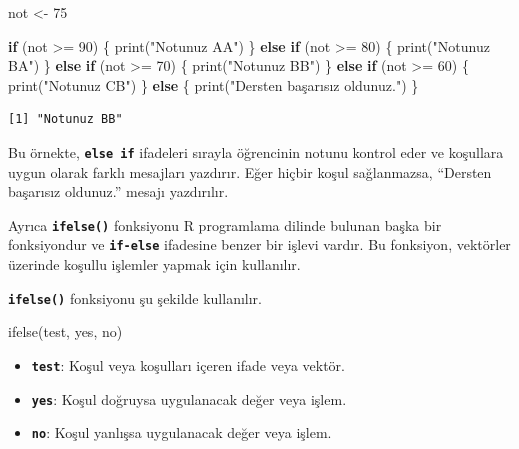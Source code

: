 \documentclass[
  letterpaper,
  DIV=11,
  numbers=noendperiod]{scrreprt}
\newenvironment{Shaded}{\begin{snugshade}}{\end{snugshade}}
\newcommand{\ControlFlowTok}[1]{\textcolor[rgb]{0.00,0.23,0.31}{\textbf{#1}}}
\newcommand{\DecValTok}[1]{\textcolor[rgb]{0.68,0.00,0.00}{#1}}
\newcommand{\FunctionTok}[1]{\textcolor[rgb]{0.28,0.35,0.67}{#1}}
\newcommand{\NormalTok}[1]{\textcolor[rgb]{0.00,0.23,0.31}{#1}}
\newcommand{\OtherTok}[1]{\textcolor[rgb]{0.00,0.23,0.31}{#1}}
\newcommand{\SpecialCharTok}[1]{\textcolor[rgb]{0.37,0.37,0.37}{#1}}
\newcommand{\StringTok}[1]{\textcolor[rgb]{0.13,0.47,0.30}{#1}}
\begin{document}
\begin{Shaded}
\begin{Highlighting}[]
\NormalTok{not }\OtherTok{\textless{}{-}} \DecValTok{75}

\ControlFlowTok{if}\NormalTok{ (not }\SpecialCharTok{\textgreater{}=} \DecValTok{90}\NormalTok{) \{}
  \FunctionTok{print}\NormalTok{(}\StringTok{"Notunuz AA"}\NormalTok{)}
\NormalTok{\} }\ControlFlowTok{else} \ControlFlowTok{if}\NormalTok{ (not }\SpecialCharTok{\textgreater{}=} \DecValTok{80}\NormalTok{) \{}
  \FunctionTok{print}\NormalTok{(}\StringTok{"Notunuz BA"}\NormalTok{)}
\NormalTok{\} }\ControlFlowTok{else} \ControlFlowTok{if}\NormalTok{ (not }\SpecialCharTok{\textgreater{}=} \DecValTok{70}\NormalTok{) \{}
  \FunctionTok{print}\NormalTok{(}\StringTok{"Notunuz BB"}\NormalTok{)}
\NormalTok{\} }\ControlFlowTok{else} \ControlFlowTok{if}\NormalTok{ (not }\SpecialCharTok{\textgreater{}=} \DecValTok{60}\NormalTok{) \{}
  \FunctionTok{print}\NormalTok{(}\StringTok{"Notunuz CB"}\NormalTok{)}
\NormalTok{\} }\ControlFlowTok{else}\NormalTok{ \{}
  \FunctionTok{print}\NormalTok{(}\StringTok{"Dersten başarısız oldunuz."}\NormalTok{)}
\NormalTok{\}}
\end{Highlighting}
\end{Shaded}

\begin{verbatim}
[1] "Notunuz BB"
\end{verbatim}

Bu örnekte, \textbf{\texttt{else\ if}} ifadeleri sırayla öğrencinin
notunu kontrol eder ve koşullara uygun olarak farklı mesajları yazdırır.
Eğer hiçbir koşul sağlanmazsa, ``Dersten başarısız oldunuz.'' mesajı
yazdırılır.

Ayrıca \textbf{\texttt{ifelse()}} fonksiyonu R programlama dilinde
bulunan başka bir fonksiyondur ve \textbf{\texttt{if-else}} ifadesine
benzer bir işlevi vardır. Bu fonksiyon, vektörler üzerinde koşullu
işlemler yapmak için kullanılır.

\textbf{\texttt{ifelse()}} fonksiyonu şu şekilde kullanılır.

\begin{Shaded}
\begin{Highlighting}[]
\FunctionTok{ifelse}\NormalTok{(test, yes, no)}
\end{Highlighting}
\end{Shaded}

\begin{itemize}
\item
  \textbf{\texttt{test}}: Koşul veya koşulları içeren ifade veya vektör.
\item
  \textbf{\texttt{yes}}: Koşul doğruysa uygulanacak değer veya işlem.
\item
  \textbf{\texttt{no}}: Koşul yanlışsa uygulanacak değer veya işlem.
\end{itemize}
\end{document}
